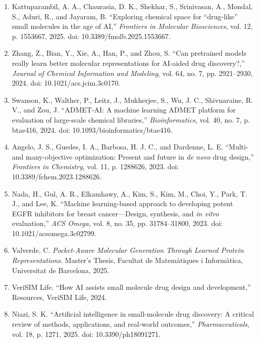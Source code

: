 \documentclass[IB]{TFUOC}%
\begin{document}
\begin{enumerate}

\item Kattuparambil, A. A., Chaurasia, D. K., Shekhar, S., Srinivasan, A., Mondal, S., Aduri, R., and Jayaram, B.  
``Exploring chemical space for ``drug-like'' small molecules in the age of AI,''  
\textit{Frontiers in Molecular Biosciences}, vol. 12, p. 1553667, 2025.  
doi: 10.3389/fmolb.2025.1553667.

\item Zhang, Z., Bian, Y., Xie, A., Han, P., and Zhou, S.  
``Can pretrained models really learn better molecular representations for AI-aided drug discovery?,''  
\textit{Journal of Chemical Information and Modeling}, vol. 64, no. 7, pp. 2921--2930, 2024.  
doi: 10.1021/acs.jcim.3c0170.

\item Swanson, K., Walther, P., Leitz, J., Mukherjee, S., Wu, J. C., Shivnaraine, R. V., and Zou, J.  
``ADMET-AI: A machine learning ADMET platform for evaluation of large-scale chemical libraries,''  
\textit{Bioinformatics}, vol. 40, no. 7, p. btae416, 2024.  
doi: 10.1093/bioinformatics/btae416.

\item Angelo, J. S., Guedes, I. A., Barbosa, H. J. C., and Dardenne, L. E.  
``Multi- and many-objective optimization: Present and future in \textit{de novo} drug design,''  
\textit{Frontiers in Chemistry}, vol. 11, p. 1288626, 2023.  
doi: 10.3389/fchem.2023.1288626.

\item Nada, H., Gul, A. R., Elkamhawy, A., Kim, S., Kim, M., Choi, Y., Park, T. J., and Lee, K.  
``Machine learning-based approach to developing potent EGFR inhibitors for breast cancer—Design, synthesis, and \textit{in vitro} evaluation,''  
\textit{ACS Omega}, vol. 8, no. 35, pp. 31784--31800, 2023.  
doi: 10.1021/acsomega.3c02799.

\item Valverde, C.  
\textit{Pocket-Aware Molecular Generation Through Learned Protein Representations}.  
Master’s Thesis, Facultat de Matemàtiques i Informàtica, Universitat de Barcelona, 2025.

\item VeriSIM Life.  
``How AI assists small molecule drug design and development,'' Resources, VeriSIM Life, 2024.

\item Niazi, S. K.  
``Artificial intelligence in small-molecule drug discovery: A critical review of methods, applications, and real-world outcomes,''  
\textit{Pharmaceuticals}, vol. 18, p. 1271, 2025.  
doi: 10.3390/ph18091271.


\end{enumerate}
\end{document}
